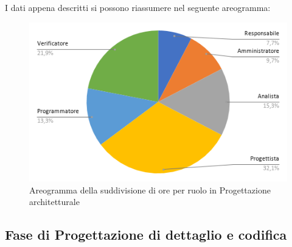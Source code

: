 I dati appena descritti si possono riassumere nel seguente areogramma:
\begin{figure}[!h]
    \vspace{5px}
    \includegraphics[scale=0.5]{../../../Images/Diagrammi/Diagramma a torta/ore architettura.png}
    \centering
    \caption{Areogramma della suddivisione di ore per ruolo in Progettazione architetturale}
\end{figure}


\subsection{Fase di Progettazione di dettaglio e codifica}
